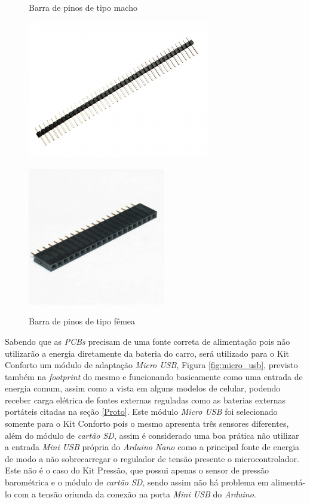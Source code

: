 \documentclass[acronym,symbols,table]{fei}
\begin{document}
\begin{figure}[!htb]
    \centering
    \begin{minipage}{0.45\textwidth}
        \caption{Barra de pinos de tipo macho}
        \includegraphics[width=\linewidth, height=6cm]{Imagens/barramacho.jpg}
        \label{fig:barramacho}
    \end{minipage}\hfill
    \begin{minipage}{0.45\textwidth}
        \caption{Barra de pinos de tipo fêmea}
        \includegraphics[width=\linewidth, height=6cm]{Imagens/barrafemea.jpg}
        \label{fig:barrafemea}
    \end{minipage}
\end{figure}

Sabendo que as \textit{PCBs} precisam de uma fonte correta de alimentação pois não utilizarão a energia diretamente da bateria do carro, será utilizado para o Kit Conforto um módulo de adaptação \textit{Micro USB}, Figura \ref{fig:micro_usb}, previsto também na \textit{footprint} do mesmo e funcionando basicamente como uma entrada de energia comum, assim como a vista em alguns modelos de celular, podendo receber carga elétrica de fontes externas reguladas como as baterias externas portáteis citadas na seção \ref{Proto}. Este módulo \textit{Micro USB} foi selecionado somente para o Kit Conforto pois o mesmo apresenta três sensores diferentes, além do módulo de \textit{cartão SD}, assim é considerado uma boa prática não utilizar a entrada \textit{Mini USB} própria do \textit{Arduino Nano} como a principal fonte de energia de modo a não sobrecarregar o regulador de tensão presente o microcontrolador. Este não é o caso do Kit Pressão, que possui apenas o sensor de pressão barométrica e o módulo de \textit{cartão SD}, sendo assim não há problema em alimentá-lo com a tensão oriunda da conexão na porta \textit{Mini USB} do \textit{Arduino}.
\end{document}
